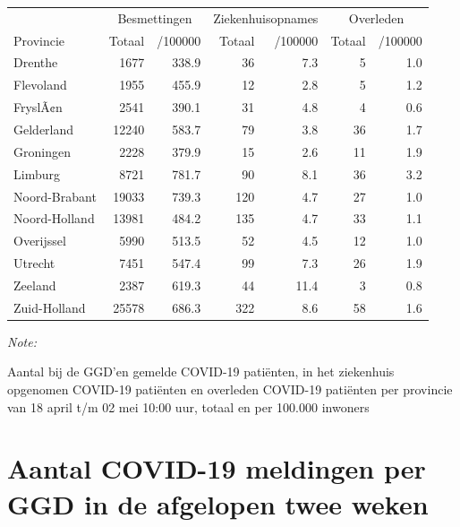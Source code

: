 \documentclass[
  english,
  man,floatsintext]{apa6}
\begin{document}
\begin{table}
\centering
\begin{threeparttable}
\begin{tabular}{lrrrrrr}
\toprule
\multicolumn{1}{c}{ } & \multicolumn{2}{c}{Besmettingen} & \multicolumn{2}{c}{Ziekenhuisopnames} & \multicolumn{2}{c}{Overleden} \\
\cmidrule(l{3pt}r{3pt}){2-3} \cmidrule(l{3pt}r{3pt}){4-5} \cmidrule(l{3pt}r{3pt}){6-7}
Provincie & Totaal & /100000 & Totaal & /100000 & Totaal & /100000\\
\midrule
Drenthe & 1677 & 338.9 & 36 & 7.3 & 5 & 1.0\\
Flevoland & 1955 & 455.9 & 12 & 2.8 & 5 & 1.2\\
FryslÃ¢n & 2541 & 390.1 & 31 & 4.8 & 4 & 0.6\\
Gelderland & 12240 & 583.7 & 79 & 3.8 & 36 & 1.7\\
Groningen & 2228 & 379.9 & 15 & 2.6 & 11 & 1.9\\
Limburg & 8721 & 781.7 & 90 & 8.1 & 36 & 3.2\\
Noord-Brabant & 19033 & 739.3 & 120 & 4.7 & 27 & 1.0\\
Noord-Holland & 13981 & 484.2 & 135 & 4.7 & 33 & 1.1\\
Overijssel & 5990 & 513.5 & 52 & 4.5 & 12 & 1.0\\
Utrecht & 7451 & 547.4 & 99 & 7.3 & 26 & 1.9\\
Zeeland & 2387 & 619.3 & 44 & 11.4 & 3 & 0.8\\
Zuid-Holland & 25578 & 686.3 & 322 & 8.6 & 58 & 1.6\\
\bottomrule
\end{tabular}
\begin{tablenotes}
\item \textit{Note: } 
\item Aantal bij de GGD’en gemelde COVID-19 patiënten, in het ziekenhuis opgenomen COVID-19 patiënten en overleden COVID-19 patiënten per provincie van 18 april t/m 02 mei 10:00 uur, totaal en per 100.000 inwoners
\end{tablenotes}
\end{threeparttable}
\end{table}

\newpage

\hypertarget{aantal-covid-19-meldingen-per-ggd-in-de-afgelopen-twee-weken}{%
\section{Aantal COVID-19 meldingen per GGD in de afgelopen twee weken}\label{aantal-covid-19-meldingen-per-ggd-in-de-afgelopen-twee-weken}}
\end{document}
